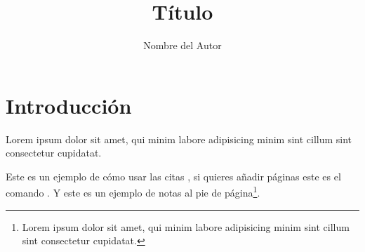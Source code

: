 \documentclass[doc,letterpaper,12pt]{apa7}
\begin{document}
\title{\Huge{Título}}

\author{Nombre del Autor}
\affiliation{}

\maketitle

\section{Introducción}

Lorem ipsum dolor sit amet, qui minim labore adipisicing minim sint cillum sint consectetur cupidatat.

Este es un ejemplo de cómo usar las citas
\parencite{Sartlp}, si quieres añadir páginas este
es el comando \parencite[50-60]{parmh}. Y este es
un ejemplo de notas al pie de
página\footnote{Lorem ipsum dolor sit amet, qui
minim labore adipisicing minim sint cillum sint
consectetur cupidatat.}.


\nocite{*} %
\printbibliography %
\end{document}
